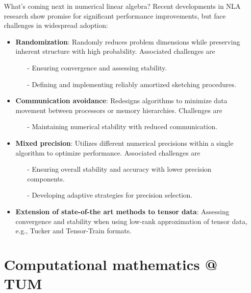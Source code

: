 \documentclass[t,usepdftitle=false]{beamer}
\begin{document}
\begin{frame}{What's coming next in numerical linear algebra?}
Recent developments in NLA research show promise for significant performance improvements, but face challenges in widespread adoption:
\begin{itemize}
\item \textbf{Randomization}: Randomly reduces problem dimensions while preserving inherent structure with high probability.
Associated challenges are
\begin{itemize}
\item[-] Ensuring convergence and assessing stability.\vspace{.08cm}
\item[-] Defining and implementing reliably amortized sketching procedures.
\end{itemize}
\item \textbf{Communication avoidance}: Redesigns algorithms to minimize data movement between processors or memory hierarchies.
Challenges are
\begin{itemize}
\item[-] Maintaining numerical stability with reduced communication.\vspace{.08cm}
\end{itemize}
\item \textbf{Mixed precision}: Utilizes different numerical precisions within a single algorithm to optimize performance.
Associated challenges are
\begin{itemize}
\item[-] Ensuring overall stability and accuracy with lower precision components.\vspace{.08cm}
\item[-] Developing adaptive strategies for precision selection.
\end{itemize}
\item \textbf{Extension of state-of-the art methods to tensor data}: Assessing convergence and stability when using low-rank approximation of tensor data, e.g., Tucker and Tensor-Train formats.
\end{itemize}
\end{frame}

\section{Computational mathematics @ TUM}
\end{document}
